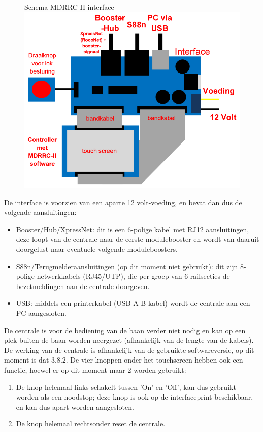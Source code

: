 \documentclass[12pt,a4paper]{report}
\begin{document}
\begin{figure}[!ht]
  \captionbox
  {Schema MDRRC-II interface\label{im:interface}}
  {\includegraphics[scale=0.5]{images/rcu_schema2}\\}
\end{figure}

De interface is voorzien van een aparte 12 volt-voeding, en bevat dan dus de volgende aansluitingen:
\begin{itemize}
\item Booster/Hub/XpressNet: dit is een 6-polige kabel met RJ12 aansluitingen, deze loopt van de centrale naar de eerste modulebooster en wordt van daaruit doorgelust naar eventuele volgende moduleboosters.
\item S88n/Terugmelderaansluitingen (op dit moment niet gebruikt): dit zijn 8-polige netwerkkabels (RJ45/UTP), die per groep van 6 railsecties de bezetmeldingen aan de centrale doorgeven.
\item USB: middels een printerkabel (USB A-B kabel) wordt de centrale aan een PC aangesloten.
\end{itemize}

De centrale is voor de bediening van de baan verder niet nodig en kan op een plek buiten de baan worden neergezet (afhankelijk van de lengte van de kabels).
De werking van de centrale is afhankelijk van de gebruikte softwareversie, op dit moment is dat 3.8.2.
De vier knoppen onder het touchscreen hebben ook een functie, hoewel er op dit moment maar 2 worden gebruikt:

\begin{enumerate}
\item De knop helemaal links schakelt tussen 'On' en 'Off', kan dus gebruikt worden als een noodstop; deze knop is ook op de interfaceprint beschikbaar, en kan dus apart worden aangesloten.
\item De knop helemaal rechtsonder reset de centrale.
\end{enumerate}
\end{document}
